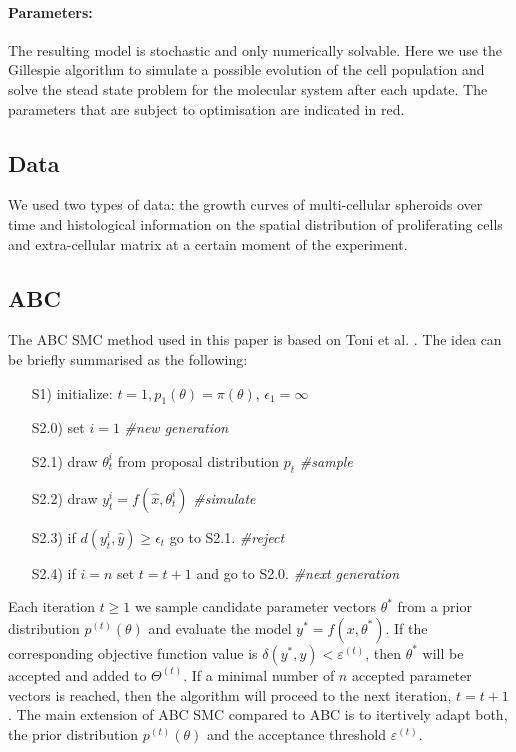 \documentclass[10pt,letterpaper]{article}
\begin{document}
\paragraph{Parameters:} 

The resulting model is stochastic and only numerically solvable. Here we use the Gillespie algorithm to simulate a possible evolution of the cell population and solve the stead state problem for the molecular system after each update. The parameters that are subject to optimisation are indicated in red.

\subsection*{Data} 
We used two types of data: the growth curves of multi-cellular spheroids over time and histological information on the spatial distribution of proliferating cells and extra-cellular matrix at a certain moment of the experiment.

\subsection*{ABC}
The ABC SMC method used in this paper is based on Toni et al. \cite{Toni2009}. The idea can be briefly summarised as the following: 

\begin{itemize}
\item[S1)] initialize: $t=1, p_{1}(\theta) = \pi(\theta)$, $\epsilon_{1} = \infty$
\item[S2.0)] set $i = 1$ \emph{\#new generation }
\item[S2.1)] draw $\theta_{t}^{i}$ from proposal distribution $p_{t}$ \emph{\#sample}
\item[S2.2)] draw $y_{t}^{i} = f(\hat{x}, \theta_{t}^{i})$ \emph{\#simulate}
\item[S2.3)] if $d( y_{t}^{i}, \hat{y}) \ge \epsilon_t$ go to S2.1. \emph{\#reject}
\item[S2.4)] if $i = n$ set $t=t+1$ and go to S2.0.  \emph{\#next generation}
\end{itemize}

Each iteration $t \ge 1$ we sample candidate parameter vectors $\theta^*$ from a prior distribution $p^{(t)}(\theta)$ and evaluate the model $y^{*} = f(x, \theta^*)$. If the corresponding  objective function value is $\delta(y^{*}, y) < \varepsilon^{(t)}$, then $\theta^*$ will be accepted and added to $\Theta^{(t)}$. If a minimal number of $n$ accepted parameter vectors is reached, then the algorithm will proceed to the next iteration, $t = t+1$. The main extension of ABC SMC compared to ABC is to itertively adapt both, the prior distribution $p^{(t)}(\theta)$ and the acceptance threshold $\varepsilon^{(t)}$.
\end{document}
